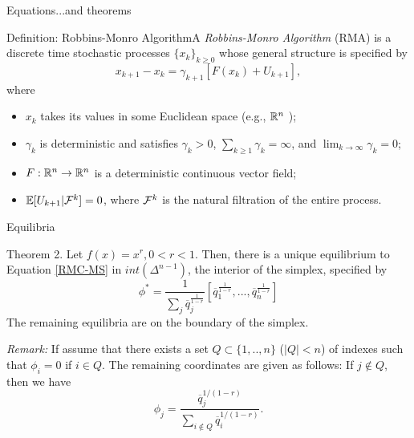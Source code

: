  
\begin{frame}[c]{Equations}{...and theorems}
\begin{block}{Definition: Robbins-Monro Algorithm}A {\it Robbins-Monro
    Algorithm} (RMA) is a discrete time stochastic processes
  $\{x_k\}_{k \geq 0}$ whose general structure is specified by
\begin{equation}
\label{RMA}
x_{k+1}-x_k=\gamma_{k+1}[F(x_k)+U_{k+1}],
\end{equation}
\noindent	
where
\begin{itemize}
\item $x_k$ takes its values in some Euclidean space (e.g., $\mathbb{R}^n$ );
\item $\gamma_k$ is deterministic and satisfies $\gamma_k>0$,
  $\sum_{k \geq 1}\gamma_k=\infty$, and $\lim_{k \to\infty}\gamma_k=0$;
\item $F:\mathbb{R}^n\to\mathbb{R}^n$ is a deterministic continuous vector field;
\item $\mathbb{E}[U_{k+1}| \mathcal{F}^k]=0$, where $\mathcal{F}^k$ is the natural filtration of
  the entire process.%
\end{itemize}
\end{block}
	
\end{frame}	
	
	
	







\begin{frame}[c]{Equilibria}
\begin{exampleblock}{Theorem 2.} 
\label{eqs}
Let $f(x)=x^r, 0<r<1$. Then, there is a unique equilibrium to Equation \eqref{RMC-MS} 
in $int(\Delta^{n-1})$, the interior of the simplex, specified by 
\[
\phi^*=\dfrac{1}{\sum_j
  \overline{q}_j^{\frac{1}{1-r}}}[\overline{q}_1^{\frac{1}{1-r}},...,\overline{q}_n^{\frac{1}{1-r}}]
\]
The remaining equilibria are on the boundary of the simplex.
\end{exampleblock}


\textcolor{anugold}{\textit{Remark:}}
If assume that there exists a set $Q\subset \{1,..,n\}$
($|Q|<n$) of indexes such that $\phi_i=0$ if $i\in Q$. The remaining coordinates are given as follows: If $j \notin
Q$, then we have
\[
\phi_j=\frac{\overline{q}_j^{1/(1-r)}}{\sum_{i\notin Q}\overline{q}_i^{1/(1-r)}}.
\]

%
\end{frame}


